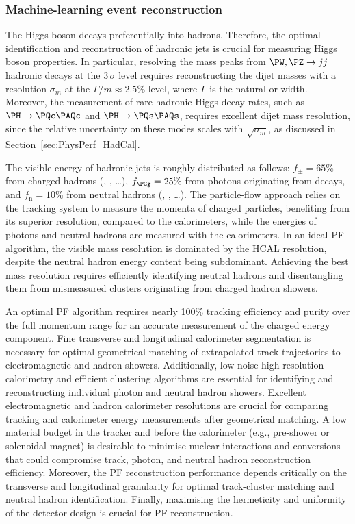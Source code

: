 \subsubsection{Machine-learning event reconstruction}

The Higgs boson decays preferentially into hadrons. 
Therefore, the optimal identification and reconstruction of hadronic jets is crucial for measuring Higgs boson properties. 
In particular, resolving the mass peaks from $\PW, \PZ \to jj$ hadronic decays at the 3\,$\sigma$ level 
requires reconstructing the dijet masses with a resolution $\sigma_m$ at the $\Gamma / m \approx 2.5\%$ level, 
where $\Gamma$ is the natural \PW or \PZ width. 
Moreover, the measurement of rare hadronic Higgs decay rates, such as $\PH \to \PQc\PAQc$ and $\PH\to \PQs\PAQs$, 
requires excellent dijet mass resolution, since the relative uncertainty on these modes scales with $\sqrt{\sigma_m}$, 
as discussed in Section~\ref{sec:PhysPerf_HadCal}.

The visible energy of hadronic jets is roughly distributed as follows: 
$f_{\pm} = 65\%$ from charged hadrons (\PGppm, \PKpm, \ldots), 
$f_{\PGg} = 25\%$ from photons originating from \PGpz decays, 
and $f_\mathrm{n} = 10\%$ from neutral hadrons (\Pn, \PKL, \ldots). 
The particle-flow approach relies on the tracking system to measure the momenta of charged particles, benefiting from its superior resolution, compared to the calorimeters, 
while the energies of photons and neutral hadrons are measured with the calorimeters. 
In an ideal PF algorithm, the visible mass resolution is dominated by the HCAL resolution, despite the neutral hadron energy content being subdominant. 
Achieving the best mass resolution requires efficiently identifying neutral hadrons and disentangling them from mismeasured clusters originating from charged hadron showers.

An optimal PF algorithm requires nearly 100\% tracking efficiency and purity over the full momentum range for an accurate measurement of the charged energy component. 
Fine transverse and longitudinal calorimeter segmentation is necessary for optimal geometrical matching of extrapolated track trajectories to electromagnetic and hadron showers. 
Additionally, low-noise high-resolution calorimetry and efficient clustering algorithms are essential for identifying and reconstructing individual photon and neutral hadron showers. 
Excellent electromagnetic and hadron calorimeter resolutions are crucial for comparing tracking and calorimeter energy measurements after geometrical matching. 
A low material budget in the tracker and before the calorimeter (e.g., pre-shower or solenoidal magnet) is desirable to minimise nuclear interactions and conversions 
that could compromise track, photon, and neutral hadron reconstruction efficiency. 
Moreover, the PF reconstruction performance depends critically on the transverse and longitudinal granularity for optimal track-cluster matching and neutral hadron identification. 
Finally, maximising the hermeticity and uniformity of the detector design is crucial for PF reconstruction.

